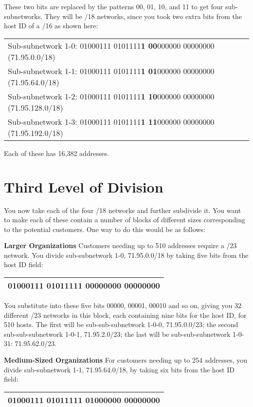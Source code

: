 These two bits are replaced by the patterns 00, 01, 10, and 11 to get
four sub-subnetworks. They will be /18 networks, since you took two
extra bits from the host ID of a /16 as shown here:

\begin{longtable}[]{@{}l@{}}
\toprule
\endhead
Sub-subnetwork 1-0: 01000111 0101111{\textbf{1 {00}}}000000 00000000
(71.95.0.0/18)\tabularnewline
Sub-subnetwork 1-1: 01000111 0101111{\textbf{1 {01}}}000000 00000000
(71.95.64.0/18)\tabularnewline
Sub-subnetwork 1-2: 01000111 0101111{\textbf{1 {10}}}000000 00000000
(71.95.128.0/18)\tabularnewline
Sub-subnetwork 1-3: 01000111 0101111{\textbf{1 {11}}}000000 00000000
(71.95.192.0/18)\tabularnewline
\bottomrule
\end{longtable}

Each of these has 16,382 addresses.




\section{Third Level of Division}

You now take each of the four /18 networks and further subdivide it. You
want to make each of these contain a number of blocks of different sizes
corresponding to the potential customers. One way to do this would be as
follows:

{\textbf{Larger Organizations}} Customers needing up to 510 addresses
require a /23 network. You divide sub-subnetwork 1-0, 71.95.0.0/18 by
taking five bits from the host ID field:

\begin{longtable}[]{@{}l@{}}
\toprule
\endhead
01000111 0101111{\textbf{1 {00}}}{{00000}}0 00000000\tabularnewline
\bottomrule
\end{longtable}

You substitute into these five bits 00000, 00001, 00010 and so on,
giving you 32 different /23 networks in this block, each containing nine
bits for the host ID, for 510 hosts. The first will be
sub-sub-subnetwork 1-0-0, 71.95.0.0/23; the second sub-sub-subnetwork
1-0-1, 71.95.2.0/23; the last will be sub-sub-subnetwork 1-0-31:
71.95.62.0/23.

{\textbf{Medium-Sized Organizations}} For customers needing up to 254
addresses, you divide sub-subnetwork 1-1, 71.95.64.0/18, by taking six
bits from the host ID field:

\begin{longtable}[]{@{}l@{}}
\toprule
\endhead
01000111 0101111{\textbf{1 {01}}}{{000000}} 00000000\tabularnewline
\bottomrule
\end{longtable}

